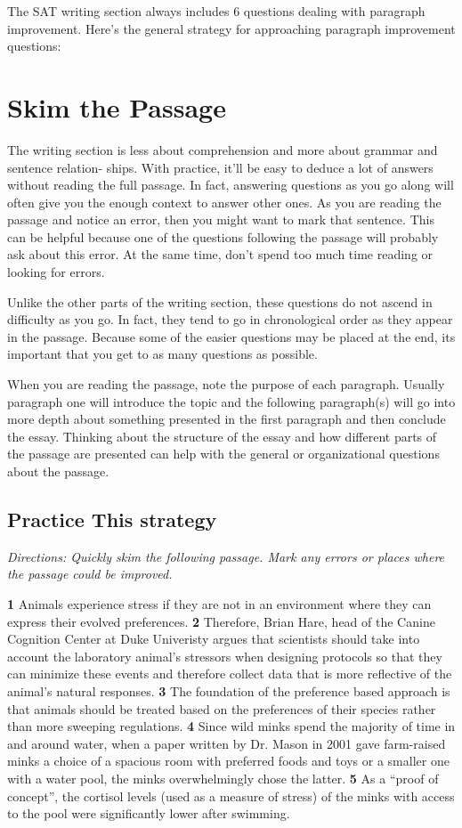 The SAT writing section always includes 6 questions dealing with paragraph improvement. Here's
the general strategy for approaching paragraph improvement questions:

\section{Skim the Passage}
The writing section is less about comprehension and more about grammar and sentence relation-
ships. With practice, it'll be easy to deduce a lot of answers without reading the full passage. In
fact, answering questions as you go along will often give you the enough context to answer other
ones. As you are reading the passage and notice an error, then you might want to mark that sentence. This can be helpful because one of the questions following the passage will probably ask about this error. At the same time, don't spend too much time reading or looking for errors.

\bigskip
Unlike the other parts of the writing section, these questions do not ascend in difficulty as you go. In fact, they tend to go in chronological order as they appear in the passage. Because some of the easier questions may be placed at the end, its important that you get to as many questions as possible.

When you are reading the passage, note the purpose of each paragraph. Usually paragraph one will introduce the topic and the following paragraph(s) will go into more depth about something presented in the first paragraph and then conclude the essay. Thinking about the structure of the essay and how different parts of the passage are presented can help with the general or organizational questions about the passage.

\subsection{Practice This strategy}
\textit{Directions: Quickly skim the following passage. Mark any errors or places where the passage could be improved.}

\indent \textbf{1} Animals experience stress if they are not in an environment where they can express their evolved preferences. \textbf{2} Therefore, Brian Hare, head of the Canine Cognition Center at Duke Univeristy argues that scientists should take into account the laboratory animal’s stressors when designing protocols so that they can minimize these events and therefore collect data that is more reflective of the animal’s natural responses. \textbf{3} The foundation of the preference based approach is that animals should be treated based on the preferences of their species rather than more sweeping regulations. \textbf{4} Since wild minks spend the majority of time in and around water, when a paper written by Dr. Mason in 2001 gave farm-raised minks a choice of a spacious room with preferred foods and toys or a smaller one with a water pool, the minks overwhelmingly chose the latter. \textbf{5} As a ``proof of concept'', the cortisol levels (used as a measure of stress) of the minks with access to the pool were significantly lower after swimming.

